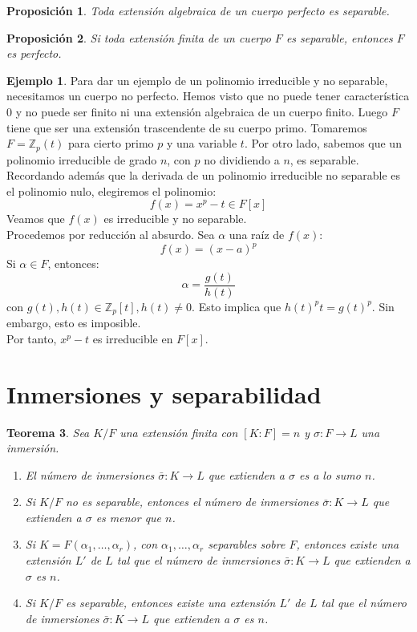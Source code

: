 \documentclass{report}
\newtheorem{theorem}{Teorema}[chapter]
\newtheorem{proposition}[theorem]{Proposición}
\theoremstyle{remark}
\theoremstyle{definition}
\theoremstyle{definition}
\theoremstyle{definition}
\newtheorem*{example}{Ejemplo}
\begin{document}
\begin{proposition}
    Toda extensión algebraica de un cuerpo perfecto es separable.
\end{proposition}

\begin{proposition}
    Si toda extensión finita de un cuerpo $F$ es separable, entonces $F$ es perfecto.
\end{proposition}

\begin{example}
    Para dar un ejemplo de un polinomio irreducible y no separable, necesitamos un cuerpo no perfecto.
    Hemos visto que no puede tener característica 0 y no puede ser finito ni una extensión algebraica de un cuerpo finito.
    Luego $F$ tiene que ser una extensión trascendente de su cuerpo primo.
    Tomaremos $F = \mathbb{Z}_p(t)$ para cierto primo $p$ y una variable $t$.
    Por otro lado, sabemos que un polinomio irreducible de grado $n$, con $p$ no dividiendo a $n$, es separable.
    Recordando además que la derivada de un polinomio irreducible no separable es el polinomio nulo, elegiremos el polinomio:
    $$f(x) = x^p - t \in F[x]$$
    Veamos que $f(x)$ es irreducible y no separable.\\
    Procedemos por reducción al absurdo. Sea $\alpha$ una raíz de $f(x)$:
    $$f(x) = (x-a)^p$$
    Si $\alpha \in F$, entonces:
    $$\alpha = \frac{g(t)}{h(t)}$$
    con $g(t), h(t) \in \mathbb{Z}_p[t], h(t) \neq 0$.
    Esto implica que $h(t)^pt = g(t)^p$. Sin embargo, esto es imposible.\\
    Por tanto, $x^p - t$ es irreducible en $F[x]$.
\end{example}

\section{Inmersiones y separabilidad}

\begin{theorem}
    Sea $K/F$ una extensión finita con $[K : F] = n$ y $\sigma : F \to L$ una inmersión.
    \begin{enumerate}
        \item El número de inmersiones $\bar{\sigma} : K \to L$ que extienden a $\sigma$ es a lo sumo $n$.
        \item Si $K/F$ no es separable, entonces el número de inmersiones $\bar{\sigma} : K \to L$ que extienden a $\sigma$ es menor que $n$.
        \item Si $K = F(\alpha_1, \dots, \alpha_r)$, con $\alpha_1, \dots, \alpha_r$ separables sobre $F$, entonces existe una extensión $L'$ de $L$ tal que el número de inmersiones $\bar{\sigma} : K \to L$ que extienden a $\sigma$ es $n$.
        \item Si $K/F$ es separable, entonces existe una extensión $L'$ de $L$ tal que el número de inmersiones $\bar{\sigma} : K \to L$ que extienden a $\sigma$ es $n$.
    \end{enumerate}
\end{theorem}
\end{document}
